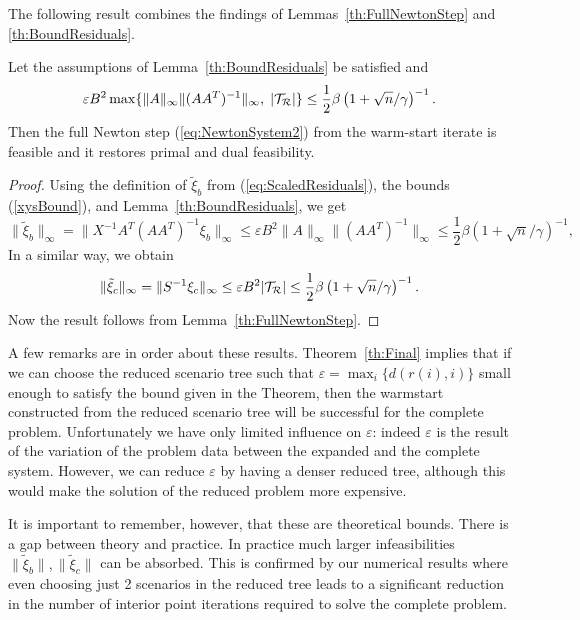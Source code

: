 The following result combines the findings of Lemmas~\ref{th:FullNewtonStep} 
and \ref{th:BoundResiduals}. 
%
\begin{theorem}  \label{th:Final}
Let the assumptions of Lemma~\ref{th:BoundResiduals} be satisfied and 
\[
\varepsilon B^2 \max\{\|A\|_\infty\|(AA^T)^{-1}\|_\infty, \; |\mathcal{T}_\mathcal{R}|\} 
   \le \frac{1}{2} \beta \left(1+\sqrt{n} / \gamma \right)^{-1}.
\]
Then the full Newton step (\ref{eq:NewtonSystem2})
from the warm-start iterate is feasible 
and it restores primal and dual feasibility.
\end{theorem}
%
\begin{proof}
Using the definition of $\tilde{\xi}_b$ from (\ref{eq:ScaledResiduals}),
the bounds (\ref{xysBound}), and Lemma~\ref{th:BoundResiduals}, we get
\[
\| \tilde{\xi}_b \|_{\infty} = \| X^{-1} A^T (AA^T)^{-1} \xi_b \|_{\infty} 
    \le
    \varepsilon B^2 \|A\|_{\infty} \|(AA^T)^{-1}\|_{\infty} 
    \le \frac{1}{2} \beta \left(1+\sqrt{n} / \gamma \right)^{-1},
\]
In a similar way, we obtain
\[
  \| \tilde{\xi}_c \|_{\infty} = \| S^{-1} \xi_c \|_\infty
                  \le \varepsilon B^2 |\mathcal{T}_\mathcal{R}|
                  \le \frac{1}{2} \beta \left(1+\sqrt{n} / \gamma \right)^{-1}.
 \]
Now the result follows from  Lemma~\ref{th:FullNewtonStep}. 
\end{proof}

A few remarks are in order about these results.
Theorem~\ref{th:Final} implies that if we can choose the reduced
scenario tree such that $\varepsilon = \max_i\{d(r(i),i)\}$ small enough
to satisfy the bound given in the Theorem, then the warmstart
constructed from the reduced scenario tree will be successful for the
complete problem. Unfortunately we have only limited influence on
$\varepsilon$: indeed $\varepsilon$ is the result of the variation of
the problem data between the expanded and the complete system.
However, we can reduce $\varepsilon$ by having a
denser reduced tree, although this would make the solution of the
reduced problem more expensive.


It is important to remember, however,
that these are theoretical bounds. There is a gap between theory and
practice. In practice much larger infeasibilities 
$\|\tilde{\xi}_b\|, \|\tilde{\xi}_c\|$ can be absorbed. This is
confirmed by our numerical results where even choosing just 2
scenarios in the reduced tree leads to a significant reduction in the
number of interior point iterations required to solve the complete problem.


